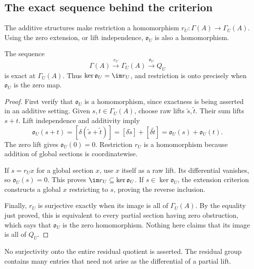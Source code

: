\subsection{The exact sequence behind the criterion}
The additive structures make restriction a homomorphism
\(r_U:\Gamma(A)\to\Gamma_U(A)\). Using the zero extension, or lift independence, \(\mathfrak o_U\) is also a homomorphism.

\begin{proposition}\label{KS12}
The sequence
\[
 \Gamma(A)\xrightarrow{r_U}\Gamma_U(A)
 \xrightarrow{\mathfrak o_U}Q_U
\]
is exact at \(\Gamma_U(A)\). Thus \(\ker\mathfrak o_U=\im r_U\), and restriction is onto precisely when \(\mathfrak o_U\) is the zero map.
\end{proposition}
\begin{proof}
First verify that $\mathfrak o_U$ is a homomorphism, since exactness is being asserted in an additive setting. Given $s,t\in\Gamma_U(A)$, choose raw lifts $\widetilde s,\widetilde t$. Their sum lifts $s+t$. Lift independence and additivity imply
\[
 \mathfrak o_U(s+t)
 =[\delta(\widetilde s+\widetilde t)]
 =[\delta\widetilde s]+[\delta\widetilde t]
 =\mathfrak o_U(s)+\mathfrak o_U(t).
\]
The zero lift gives $\mathfrak o_U(0)=0$. Restriction $r_U$ is a homomorphism because addition of global sections is coordinatewise.

If $s=r_Ux$ for a global section $x$, use $x$ itself as a raw lift. Its differential vanishes, so $\mathfrak o_U(s)=0$. This proves $\im r_U\subseteq\ker\mathfrak o_U$. If $s\in\ker\mathfrak o_U$, the extension criterion constructs a global $x$ restricting to $s$, proving the reverse inclusion.

Finally, $r_U$ is surjective exactly when its image is all of $\Gamma_U(A)$. By the equality just proved, this is equivalent to every partial section having zero obstruction, which says that $\mathfrak o_U$ is the zero homomorphism. Nothing here claims that its image is all of $Q_U$.
\end{proof}
No surjectivity onto the entire residual quotient is asserted. The residual group contains many entries that need not arise as the differential of a partial lift.

